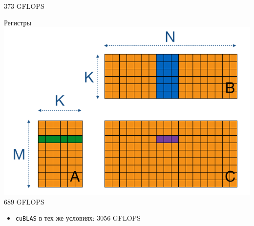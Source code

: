 \documentclass[xcolor=table,aspectratio=169]{beamer}
\begin{document}
\begin{frame}[fragile]
\begin{minipage}[t][0.5\textheight]{0.32\textwidth}
\begin{center}
    \vfill
    373 GFLOPS
  \end{center}
  \end{minipage}
  \begin{minipage}[t][0.5\textheight]{0.32\textwidth}
    \begin{center}
      \vspace{-1cm}
      Регистры
    \includegraphics[valign=t,width=\textwidth]{pictures/gemm3.png}
    \vfill
    689 GFLOPS
  \end{center}
  \end{minipage}
  \vfill
  \begin{itemize}
    \item \texttt{cuBLAS} в тех же условиях: 3056 GFLOPS
  \end{itemize}
\end{frame}
\end{document}
